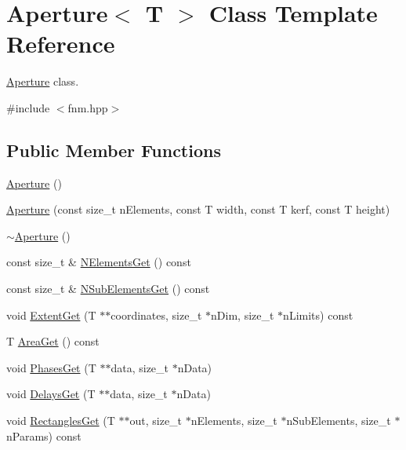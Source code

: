 \hypertarget{classfnm_1_1Aperture}{\section{Aperture$<$ T $>$ Class Template Reference}
\label{classfnm_1_1Aperture}
}


\hyperlink{classfnm_1_1Aperture}{Aperture} class.  




{\ttfamily \#include $<$fnm.\+hpp$>$}

\subsection*{Public Member Functions}
\begin{DoxyCompactItemize}
\item 
\hyperlink{classfnm_1_1Aperture_a3990298bb3b2d0cd9275a039d6bd8319}{Aperture} ()
\item 
\hyperlink{classfnm_1_1Aperture_a48761e9fd3f7270c9de20abce9a8bad5}{Aperture} (const size\+\_\+t n\+Elements, const T width, const T kerf, const T height)
\item 
\hyperlink{classfnm_1_1Aperture_acf8f763505318fa40717d41620560d3b}{$\sim$\+Aperture} ()
\item 
const size\+\_\+t \& \hyperlink{classfnm_1_1Aperture_ab0d91160f41e515aa56b4a961c528e32}{N\+Elements\+Get} () const 
\item 
const size\+\_\+t \& \hyperlink{classfnm_1_1Aperture_a5c28c71c5172cfe9ecce41f112297073}{N\+Sub\+Elements\+Get} () const 
\item 
void \hyperlink{classfnm_1_1Aperture_a63d391bb8c52d45c1ba48f765ce1943c}{Extent\+Get} (T $\ast$$\ast$coordinates, size\+\_\+t $\ast$n\+Dim, size\+\_\+t $\ast$n\+Limits) const 
\item 
T \hyperlink{classfnm_1_1Aperture_a5a2beeb4beb4cdac3ee643598eb43421}{Area\+Get} () const 
\item 
void \hyperlink{classfnm_1_1Aperture_a7f1c68283a50419ef55a3af3a2da7a18}{Phases\+Get} (T $\ast$$\ast$data, size\+\_\+t $\ast$n\+Data)
\item 
void \hyperlink{classfnm_1_1Aperture_a4af91355130ec0fe184a9ccd380b8ba1}{Delays\+Get} (T $\ast$$\ast$data, size\+\_\+t $\ast$n\+Data)
\item 
void \hyperlink{classfnm_1_1Aperture_a109e4080fa678b8ae57cfc4da2c9e364}{Rectangles\+Get} (T $\ast$$\ast$out, size\+\_\+t $\ast$n\+Elements, size\+\_\+t $\ast$n\+Sub\+Elements, size\+\_\+t $\ast$n\+Params) const 

\end{DoxyCompactItemize}
